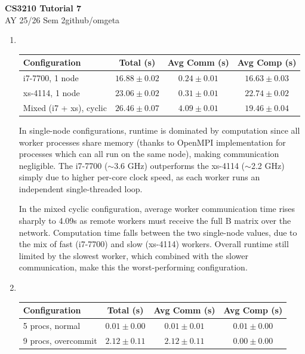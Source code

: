 \documentclass[12pt, a4paper]{article}
\newcommand{\mytitle}{CS3210 Tutorial 7}
\newcommand{\myauthor}{github/omgeta}
\newcommand{\mydate}{AY 25/26 Sem 2}
\begin{document}
\raggedright
\normalsize
\begin{center}
{\normalsize{\textbf{\mytitle}}} \\
{\footnotesize{\mydate\hspace{2pt}\textemdash\hspace{2pt}\myauthor}}
\end{center}
\begin{enumerate}[start=10]
  \item \quad\\ 
      \begin{tabular}{lccc}
      \toprule
      \textbf{Configuration} & \textbf{Total (s)} & \textbf{Avg Comm (s)} & \textbf{Avg Comp (s)} \\
      \midrule
      i7-7700, 1 node         & $16.88 \pm 0.02$ & $0.24 \pm 0.01$ & $16.63 \pm 0.03$ \\
      xs-4114, 1 node         & $23.06 \pm 0.02$ & $0.31 \pm 0.01$ & $22.74 \pm 0.02$ \\
      Mixed (i7 + xs), cyclic & $26.46 \pm 0.07$ & $4.09 \pm 0.01$ & $19.46 \pm 0.04$ \\
      \bottomrule
      \end{tabular}

    In single-node configurations, runtime is dominated by computation since all worker processes share memory (thanks to OpenMPI implementation for processes which can all run on the same node), making communication negligible. The i7-7700 ($\sim$3.6 GHz) outperforms the xs-4114 ($\sim$2.2 GHz) simply due to higher per-core clock speed, as each worker runs an independent single-threaded loop.

  In the mixed cyclic configuration, average worker communication time rises sharply to 4.09s as remote workers must receive the full B matrix over the network. Computation time falls between the two single-node values, due to the mix of fast (i7-7700) and slow (xs-4114) workers. Overall runtime still limited by the slowest worker, which combined with the slower communication, make this the worst-performing configuration.

  \item \quad\\ 
  \begin{tabular}{lccc}
  \toprule
  \textbf{Configuration} & \textbf{Total (s)} & \textbf{Avg Comm (s)} & \textbf{Avg Comp (s)} \\
  \midrule
  5 procs, normal     & $0.01 \pm 0.00$ & $0.01 \pm 0.01$ & $0.01 \pm 0.00$ \\
  9 procs, overcommit & $2.12 \pm 0.11$ & $2.12 \pm 0.11$ & $0.00 \pm 0.00$ \\
  \bottomrule
  \end{tabular}


\end{enumerate}
\end{document}
